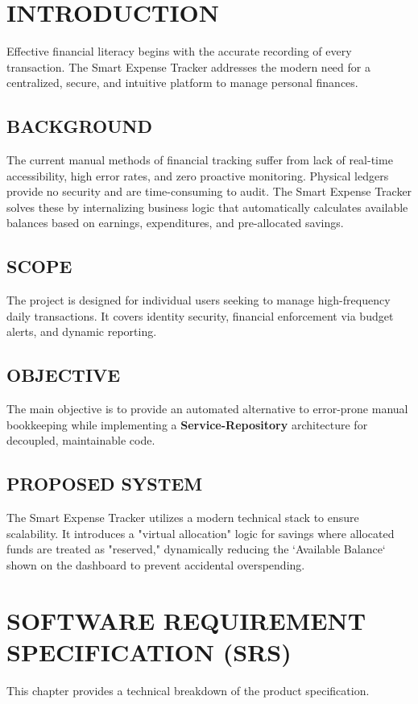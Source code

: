 \documentclass[12pt,a4paper]{article}
\begin{document}
\newpage

\section{INTRODUCTION}
Effective financial literacy begins with the accurate recording of every transaction. The Smart Expense Tracker addresses the modern need for a centralized, secure, and intuitive platform to manage personal finances.

\subsection{BACKGROUND}
The current manual methods of financial tracking suffer from lack of real-time accessibility, high error rates, and zero proactive monitoring. Physical ledgers provide no security and are time-consuming to audit. The Smart Expense Tracker solves these by internalizing business logic that automatically calculates available balances based on earnings, expenditures, and pre-allocated savings.

\subsection{SCOPE}
The project is designed for individual users seeking to manage high-frequency daily transactions. It covers identity security, financial enforcement via budget alerts, and dynamic reporting.

\subsection{OBJECTIVE}
The main objective is to provide an automated alternative to error-prone manual bookkeeping while implementing a \textbf{Service-Repository} architecture for decoupled, maintainable code.

\subsection{PROPOSED SYSTEM}
The Smart Expense Tracker utilizes a modern technical stack to ensure scalability. It introduces a "virtual allocation" logic for savings where allocated funds are treated as "reserved," dynamically reducing the `Available Balance` shown on the dashboard to prevent accidental overspending.

\newpage

\section{SOFTWARE REQUIREMENT SPECIFICATION (SRS)}
This chapter provides a technical breakdown of the product specification.
\end{document}
